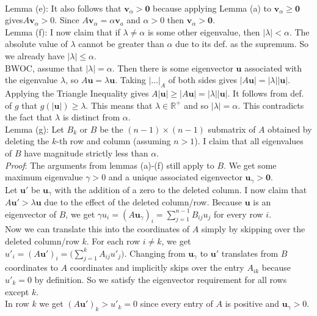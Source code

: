 \documentclass[14pt,letterpaper]{extarticle}
\newcommand*{\bv}{\mathbf{v}}
\newcommand*{\bu}{\mathbf{u}}
\newcommand*{\bvz}{\mathbf{0}}
\newcommand*{\R}{\mathbb{R}}
\begin{document}
\vspace{2mm} \\
Lemma (e): It also follows that $\bv_\alpha>\bvz$ because applying Lemma (a) to $\bv_\alpha\ge \bvz$ gives$A\bv_\alpha> 0$. Since $A\bv_\alpha=\alpha\bv_a$ and $\alpha> 0$ then $\bv_\alpha>\bvz$.
\vspace{2mm} \\
Lemma (f): I now claim that if $\lambda\ne \alpha$ is some other eigenvalue, then $|\lambda|<\alpha$.
The absolute value of $\lambda$ cannot be greater than $\alpha$ due to its def. as the supremum.
So we already have $|\lambda|\le \alpha$. \\
BWOC, assume that $|\lambda|=\alpha$.
Then there is some eigenvector $\bu$ associated with the eigenvalue $\lambda$, so $A\bu=\lambda\bu$.
Taking $|\dots|_A$ of both sides gives $|A\bu|=|\lambda||\bu|$.
Applying the Triangle Inequality gives $A|\bu|\ge |A\bu|=|\lambda||\bu|$.
It follows from def. of $g$ that $g(|\bu|)\ge \lambda$.
This means that $\lambda \in \R^+$ and so $|\lambda|=\alpha$. 
This contradicts the fact that $\lambda$ is distinct from $\alpha$.
\vspace{2mm} \\
Lemma (g): Let $B_k$ or $B$ be the $(n-1)\times(n-1)$ submatrix of $A$ obtained by deleting the $k$-th row and column (assuming $n>1$). 
I claim that all eigenvalues of $B$ have magnitude strictly less than $\alpha$. \\
\textit{Proof}: The arguments from lemmas (a)-(f) still apply to $B$.
We get some maximum eigenvalue $\gamma>0$ and a unique associated eigenvector $\bu_{\gamma} > \bvz$. \\
Let $\bu'$ be $\bu_\gamma$ with the addition of a zero to the deleted column.
I now claim that $A\bu'> \lambda\bu$ due to the effect of the deleted column/row.
Because $\bu$ is an eigenvector of $B$, we get $\gamma u_i=(A\bu_\gamma)_i=\sum_{j=1}^{n-1}B_{ij}u_j$ for every row $i$. \\
Now we can translate this into the coordinates of $A$ simply by skipping over the deleted column/row $k$.
For each row $i \ne k$, we get $u'_i=(A\bu')_i=\big(\sum_{j=1}^k A_{ij}u'_j)$.
Changing from $\bu_\gamma$ to $\bu'$ translates from $B$ coordinates to $A$ coordinates and implicitly skips over the entry $A_{ik}$ because $u'_k=0$ by definition.
So we satisfy the eigenvector requirement for all rows except $k$. \\
In row $k$ we get $(A\bu')_k>u'_k=0$ since every entry of $A$ is positive and $\bu_\gamma>0$. \\
\end{document}
